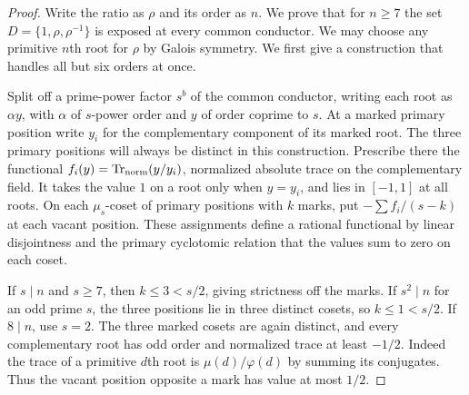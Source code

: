 \documentclass[11pt,a4paper]{article}
\numberwithin{equation}{section}
\theoremstyle{remark}
\newcommand{\Tr}{\operatorname{Tr}}
\begin{document}
\begin{proof}
Write the ratio as $\rho$ and its order as $n$. We prove that for
$n\ge7$ the set $D=\{1,\rho,\rho^{-1}\}$ is exposed at every common
conductor. We may choose any primitive $n$th root for $\rho$ by
Galois symmetry. We first give a construction that handles all but
six orders at once.

Split off a prime-power factor $s^b$ of the common conductor, writing
each root as $\alpha y$, with $\alpha$ of $s$-power order and $y$ of
order coprime to $s$. At a marked primary position write $y_i$ for
the complementary component of its marked root. The three primary
positions will always be distinct in this construction. Prescribe
there the functional $f_i(y)=\Tr_{\rm norm}(y/y_i)$, normalized
absolute trace on the complementary field. It takes the value $1$
on a root only when $y=y_i$, and lies in $[-1,1]$ at all roots.
On each $\mu_s$-coset of primary positions with $k$ marks, put
$-\sum f_i/(s-k)$ at each vacant position. These assignments define a
rational functional by linear disjointness and the primary
cyclotomic relation that the values sum to zero on each coset.

If $s\mid n$ and $s\ge7$, then $k\le3<s/2$, giving strictness
off the marks. If $s^2\mid n$ for an odd prime $s$, the three
positions lie in three distinct cosets, so $k\le1<s/2$.
If $8\mid n$, use $s=2$. The three marked cosets are again
distinct, and every complementary root has odd order and normalized
trace at least $-1/2$. Indeed the trace of a primitive $d$th root is
$\mu(d)/\varphi(d)$ by summing its conjugates. Thus the vacant
position opposite a mark has value at most $1/2$.


\end{proof}
\end{document}
